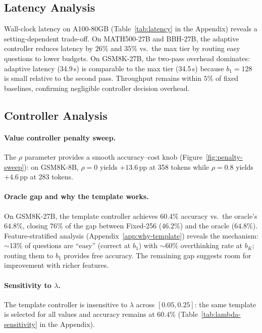 \subsection{Latency Analysis}
\label{sec:exp:latency}

Wall-clock latency on A100-80GB (Table~\ref{tab:latency} in the Appendix) reveals a setting-dependent trade-off.
On MATH500-27B and BBH-27B, the adaptive controller reduces latency by $26\%$ and $35\%$ vs.\ the max tier by routing easy questions to lower budgets.
On GSM8K-27B, the two-pass overhead dominates: adaptive latency (34.9\,s) is comparable to the max tier (34.5\,s) because $b_1{=}128$ is small relative to the second pass.
Throughput remains within $5\%$ of fixed baselines, confirming negligible controller decision overhead.

\subsection{Controller Analysis}
\label{sec:exp:analysis}

\paragraph{Value controller penalty sweep.}
The $\rho$ parameter provides a smooth accuracy--cost knob (Figure~\ref{fig:penalty-sweep}): on GSM8K-8B, $\rho{=}0$ yields $+13.6$\,pp at 358 tokens while $\rho{=}0.8$ yields $+4.6$\,pp at 283 tokens.

\paragraph{Oracle gap and why the template works.}
On GSM8K-27B, the template controller achieves $60.4\%$ accuracy vs.\ the oracle's $64.8\%$, closing $76\%$ of the gap between Fixed-256 ($46.2\%$) and the oracle ($64.8\%$).
Feature-stratified analysis (Appendix~\ref{app:why-template}) reveals the mechanism: $\sim$13\% of questions are ``easy'' (correct at $b_1$) with $\sim$60\% overthinking rate at $b_K$; routing them to $b_1$ provides free accuracy.
The remaining gap suggests room for improvement with richer features.

\paragraph{Sensitivity to $\lambda$.}
The template controller is insensitive to $\lambda$ across $[0.05, 0.25]$: the same template is selected for all values and accuracy remains at $60.4\%$ (Table~\ref{tab:lambda-sensitivity} in the Appendix).

